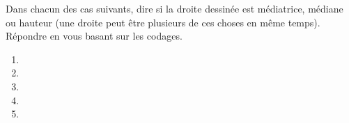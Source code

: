 
\begin{exercice}\label{exosmath-0918}

    Dans chacun des cas suivants, dire si la droite dessinée est médiatrice, médiane ou hauteur (une droite peut être plusieurs de ces choses en même temps). Répondre en vous basant sur les codages.
    \begin{multicols}{2}
        \begin{enumerate}
            \item
                
            \item
                
            \item
                
            \item
                
            \item
                
        \end{enumerate}
    \end{multicols}

\end{exercice}
